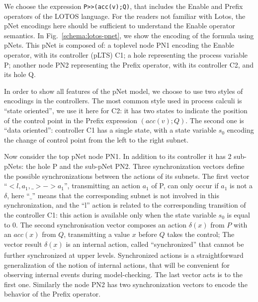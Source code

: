 \documentclass{lncs/llncs}
\begin{document}
We choose the expression \texttt{P>>(acc(v);Q)}, that includes the
Enable and Prefix 
operators of the LOTOS language. For the readers not familiar with
Lotos, the pNet encodings here should be sufficient to understand the
Enable operator semantics.
In Fig.~\ref{schema:lotos-pnet}, we show the encoding of the formula using pNets. 
This pNet is composed of: a toplevel node PN1 encoding the Enable
operator, with its controller (pLTS) C1; a hole representing the
process variable P; another node PN2 representing the Prefix
operator, with its controller C2, and its hole Q. 

In order to show all features of the pNet model, we choose to use two
styles of encodings in the controllers.
The most common style used in process calculi is ``state oriented'',
we use it here for C2: it has two states to
indicate the position of the control point in the
Prefix expression $(acc(v);Q)$. The second one is
``data oriented'': controller C1 has a single state, with a state
variable $s_0$ encoding the change of control point from the left to
the right subnet.

Now consider the top pNet node PN1. In addition to
its controller it has 2 sub-pNets: the hole P and the sub-pNet PN2.
Three synchronization vectors define the possible
synchronizations between the actions of its subnets.
The first vector ``$< l, a_1 , \_ > -> a_1$'', transmitting an action
$a_1$ of P, can only occur if $a_1$ is not  
a $\delta$, here ``$\_$'' means that the corresponding subnet is
not involved in this synchronization, and the ``l'' action is related
to the corresponding transition of the controller C1: this action is
available only when the state variable $s_0$ is equal to 0.
The second synchronisation vector composes an
action $\delta(x)$ from $P$ with an $acc(x)$ from $Q$, transmitting a
value $x$ before $Q$ takes the control; 
The vector result $\underline{\delta(x)}$ is an
internal action, called ``synchronized'' that cannot be further
synchronized at upper levels. Synchronized actions is a straightforward
generalization of the notion of internal actions, that will be
convenient for observing internal events during model-checking.
The last vector acts is to the first one.  
Similarly the node PN2 has two synchronization vectors to encode
the behavior of the Prefix operator.
\end{document}

